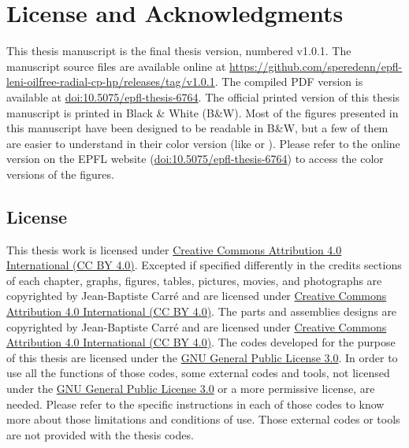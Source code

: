 \chapter{License and Acknowledgments}
\label{chap:licenses}

This thesis manuscript is the final thesis version, numbered
v1.0.1. The manuscript source files are available online at
\href{https://github.com/speredenn/epfl-leni-oilfree-radial-cp-hp/releases/tag/v1.0.1}{https://github.com/speredenn/epfl-leni-oilfree-radial-cp-hp/releases/tag/v1.0.1}. The
compiled PDF version is available at
\href{http://dx.doi.org/10.5075/epfl-thesis-6764}{doi:10.5075/epfl-thesis-6764}. The
official printed version of this thesis manuscript is printed in Black
\& White (B\&W). Most of the figures presented in this manuscript have
been designed to be readable in B\&W, but a few of them are easier to
understand in their color version (like
 or
). Please refer to the
online version on the EPFL website
(\href{http://dx.doi.org/10.5075/epfl-thesis-6764}{doi:10.5075/epfl-thesis-6764})
to access the color versions of the figures.

\section*{License}
\label{sec:licenses}

This thesis work is licensed under
\href{http://creativecommons.org/licenses/by/4.0/}{Creative Commons
  Attribution 4.0 International (CC BY
  4.0)}. Excepted
if specified differently in the credits sections of each chapter,
graphs, figures, tables, pictures, movies, and photographs are
copyrighted by Jean-Baptiste Carré and are licensed under
\href{http://creativecommons.org/licenses/by/4.0/}{Creative Commons
  Attribution 4.0 International (CC BY 4.0)}. The parts and assemblies
designs are copyrighted by Jean-Baptiste Carré and are licensed under
\href{http://creativecommons.org/licenses/by/4.0/}{Creative Commons
  Attribution 4.0 International (CC BY 4.0)}. The codes developed for
the purpose of this thesis are licensed under the
\href{http://www.gnu.org/licenses/gpl.html}{GNU General Public License
  3.0}. In order to
use all the functions of those codes, some external codes and tools,
not licensed under the \href{http://www.gnu.org/licenses/gpl.html}{GNU
  General Public License 3.0} or a more permissive license, are
needed. Please refer to the specific instructions in each of those
codes to know more about those limitations and conditions of
use. Those external codes or tools are not provided with the thesis
codes.

